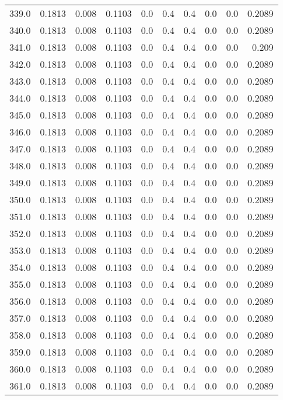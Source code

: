 \begin{longtable}{lrrrrrrrrr}
339.0 & 0.1813 & 0.008 & 0.1103 & 0.0 & 0.4 & 0.4 & 0.0 & 0.0 & 0.2089 \\
340.0 & 0.1813 & 0.008 & 0.1103 & 0.0 & 0.4 & 0.4 & 0.0 & 0.0 & 0.2089 \\
341.0 & 0.1813 & 0.008 & 0.1103 & 0.0 & 0.4 & 0.4 & 0.0 & 0.0 & 0.209 \\
342.0 & 0.1813 & 0.008 & 0.1103 & 0.0 & 0.4 & 0.4 & 0.0 & 0.0 & 0.2089 \\
343.0 & 0.1813 & 0.008 & 0.1103 & 0.0 & 0.4 & 0.4 & 0.0 & 0.0 & 0.2089 \\
344.0 & 0.1813 & 0.008 & 0.1103 & 0.0 & 0.4 & 0.4 & 0.0 & 0.0 & 0.2089 \\
345.0 & 0.1813 & 0.008 & 0.1103 & 0.0 & 0.4 & 0.4 & 0.0 & 0.0 & 0.2089 \\
346.0 & 0.1813 & 0.008 & 0.1103 & 0.0 & 0.4 & 0.4 & 0.0 & 0.0 & 0.2089 \\
347.0 & 0.1813 & 0.008 & 0.1103 & 0.0 & 0.4 & 0.4 & 0.0 & 0.0 & 0.2089 \\
348.0 & 0.1813 & 0.008 & 0.1103 & 0.0 & 0.4 & 0.4 & 0.0 & 0.0 & 0.2089 \\
349.0 & 0.1813 & 0.008 & 0.1103 & 0.0 & 0.4 & 0.4 & 0.0 & 0.0 & 0.2089 \\
350.0 & 0.1813 & 0.008 & 0.1103 & 0.0 & 0.4 & 0.4 & 0.0 & 0.0 & 0.2089 \\
351.0 & 0.1813 & 0.008 & 0.1103 & 0.0 & 0.4 & 0.4 & 0.0 & 0.0 & 0.2089 \\
352.0 & 0.1813 & 0.008 & 0.1103 & 0.0 & 0.4 & 0.4 & 0.0 & 0.0 & 0.2089 \\
353.0 & 0.1813 & 0.008 & 0.1103 & 0.0 & 0.4 & 0.4 & 0.0 & 0.0 & 0.2089 \\
354.0 & 0.1813 & 0.008 & 0.1103 & 0.0 & 0.4 & 0.4 & 0.0 & 0.0 & 0.2089 \\
355.0 & 0.1813 & 0.008 & 0.1103 & 0.0 & 0.4 & 0.4 & 0.0 & 0.0 & 0.2089 \\
356.0 & 0.1813 & 0.008 & 0.1103 & 0.0 & 0.4 & 0.4 & 0.0 & 0.0 & 0.2089 \\
357.0 & 0.1813 & 0.008 & 0.1103 & 0.0 & 0.4 & 0.4 & 0.0 & 0.0 & 0.2089 \\
358.0 & 0.1813 & 0.008 & 0.1103 & 0.0 & 0.4 & 0.4 & 0.0 & 0.0 & 0.2089 \\
359.0 & 0.1813 & 0.008 & 0.1103 & 0.0 & 0.4 & 0.4 & 0.0 & 0.0 & 0.2089 \\
360.0 & 0.1813 & 0.008 & 0.1103 & 0.0 & 0.4 & 0.4 & 0.0 & 0.0 & 0.2089 \\
361.0 & 0.1813 & 0.008 & 0.1103 & 0.0 & 0.4 & 0.4 & 0.0 & 0.0 & 0.2089 \\

\end{longtable}
